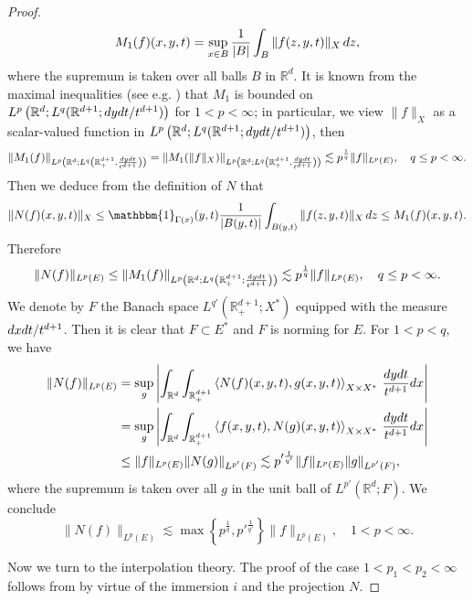 \documentclass[oneside,english,a4wide]{amsart}
\numberwithin{equation}{section}
\numberwithin{figure}{section}
\theoremstyle{plain}
\theoremstyle{plain}
\theoremstyle{definition}
\theoremstyle{plain}
\theoremstyle{remark}
\theoremstyle{definition}
\theoremstyle{remark}
\theoremstyle{definition}
\newcommand{\Rmnum}[1]{\uppercase\expandafter{\romannumeral #1}}
\newcommand{\real}{{\mathbb R}}
\newcommand{\8}{+\infty}
\renewcommand{\1}{\mathbbm{1}}
\newcommand\jdz[1]{ \left| #1 \right| }
\newcommand\sk[1]{ \left( #1 \right) }
\newcommand\lk[1]{ \left\{ #1 \right\} }
\newcommand{\lara}[1]{\left\langle #1 \right\rangle}
\renewcommand\d{{\rm d}}
\begin{document}
{\begin{proof}
\[
    M_1(f)(x, y, t) = \sup_{x \in B} \frac{1}{|B|} \int_B \|f(z, y, t)\|_X\, \d z,
\]
where the supremum is taken over all balls $B$ in $\real^d$. It is known from the maximal inequalities (see e.g. \cite[Chapter \Rmnum{2}]{Stein1993}) that $M_1$ is bounded on $L^p\sk{ \real^d; L^q(\real^{d+1}; \d y\d t/t^{d+1}) }$ for $1 < p < \infty$; in particular, we view $\|f\|_X$ as a scalar-valued function in $L^p\sk{ \real^d; L^q(\real^{d+1}; \d y\d t/t^{d+1}) }$, then
\[
    \| M_1(f) \|_{L^p\sk{ \real^d; L^q\sk{ \real^{d+1}_+, \frac{\d y\d t}{t^{d+1}}} } } = \| M_1(\|f\|_X) \|_{L^p\sk{ \real^d; L^q\sk{ \real^{d+1}_+, \frac{\d y\d t}{t^{d+1}}} } } \lesssim p^{\frac{1}{q}}\| f \|_{L^p(E)}, \quad q \leq p < \infty.
\]
Then we deduce from the definition of $N$ that
\[
    \| N(f)(x, y, t) \|_X \leq \1_{\Gamma(x)}(y, t) \frac{1}{|B(y, t)|} \int_{ B(y, t) } \|f(z, y, t)\|_X \,\d z \leq M_1(f)(x, y, t).
\]
Therefore
\[
    \| N(f) \|_{L^p(E)} \leq \| M_1(f) \|_{L^p\sk{ \real^d; L^q\sk{ \real^{d+1}_+; \frac{\d y\d t}{t^{d+1}}} }} \lesssim p^{\frac{1}{q}} \| f \|_{L^p(E)}, \quad q \leq p < \infty.
\]
We denote by $F$ the Banach space $L^{q'}(\real^{d+1}_+; X^*)$ equipped with the measure $\d x\d t/t^{d+1}$. Then it is clear that $F \subset E^*$ and $F$ is norming for $E$. For $1 < p < q$, we have 
\[
\begin{aligned}
    \| N(f) \|_{L^p(E)} & = \sup_{g} \jdz{ \int_{\real^d}\int_{\real^{d+1}_+} \lara{ N(f)(x, y, t), g(x, y, t) }_{X\times X^*}\,\frac{\d y\d t}{t^{d+1}}\d x }\\
    & = \sup_{g} \jdz{ \int_{\real^d}\int_{\real^{d+1}_+} \lara{ f(x, y, t), N(g)(x, y, t) }_{X\times X^*}\,\frac{\d y\d t}{t^{d+1}}\d x }\\
    & \leq \| f \|_{L^p(E)} \| N(g) \|_{L^{p'}(F)} \lesssim p'^{\frac{1}{q'}}\| f \|_{L^p(E)}\| g \|_{L^{p'}(F)},
\end{aligned}
\]
where the supremum is taken over all $g$ in the unit ball of $L^{p'}(\real^d; F)$. We conclude
\begin{equation}\label{esN}
    \| N(f) \|_{L^p(E)} \lesssim \max\lk{ p^{\frac{1}{q}}, p'^{\frac{1}{q'}} }\| f \|_{L^p(E)}, \quad 1 < p < \infty.
\end{equation}

Now we turn to the interpolation theory. The proof of the case $1 < p_1 < p_2 < \infty$ follows from \cite{Harboure1991} by virtue of the immersion $i$ and the projection $N$. 


\end{proof}}
\end{document}

